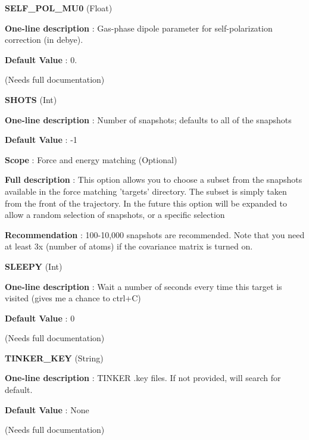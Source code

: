 \begin{DoxyItemize}
\item {\bfseries  S\-E\-L\-F\-\_\-\-P\-O\-L\-\_\-\-M\-U0 } (Float) \par
{\bfseries  One-\/line description }\-: Gas-\/phase dipole parameter for self-\/polarization correction (in debye). \par
{\bfseries  Default Value }\-: 0. \par
(Needs full documentation)\end{DoxyItemize}
\begin{DoxyItemize}
\item {\bfseries  S\-H\-O\-T\-S } (Int) \par
{\bfseries  One-\/line description }\-: Number of snapshots; defaults to all of the snapshots \par
{\bfseries  Default Value }\-: -\/1 \par
{\bfseries  Scope }\-: Force and energy matching (Optional) \par
{\bfseries  Full description }\-: This option allows you to choose a subset from the snapshots available in the force matching 'targets' directory. The subset is simply taken from the front of the trajectory. In the future this option will be expanded to allow a random selection of snapshots, or a specific selection \par
{\bfseries  Recommendation }\-: 100-\/10,000 snapshots are recommended. Note that you need at least 3x (number of atoms) if the covariance matrix is turned on.\end{DoxyItemize}
\begin{DoxyItemize}
\item {\bfseries  S\-L\-E\-E\-P\-Y } (Int) \par
{\bfseries  One-\/line description }\-: Wait a number of seconds every time this target is visited (gives me a chance to ctrl+\-C) \par
{\bfseries  Default Value }\-: 0 \par
(Needs full documentation)\end{DoxyItemize}
\begin{DoxyItemize}
\item {\bfseries  T\-I\-N\-K\-E\-R\-\_\-\-K\-E\-Y } (String) \par
{\bfseries  One-\/line description }\-: T\-I\-N\-K\-E\-R .key files. If not provided, will search for default. \par
{\bfseries  Default Value }\-: None \par
(Needs full documentation)\end{DoxyItemize}
